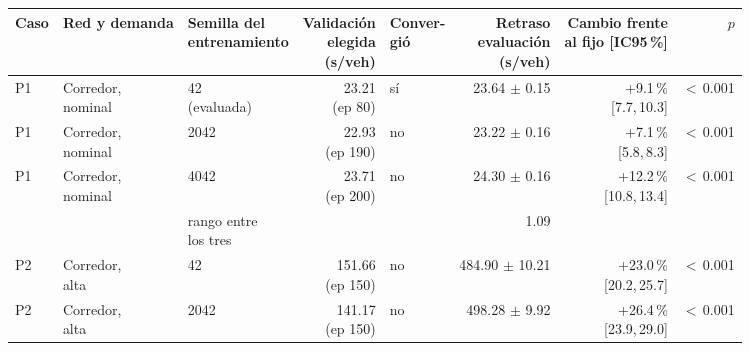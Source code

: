 \begin{table}[H]
\centering
\scriptsize
\setlength{\tabcolsep}{3pt}
\begin{tabular}{lllrlrrr}
\toprule
Caso & Red y demanda & \makecell{Semilla del\\entrenamiento} & \makecell{Validación\\elegida\\(s/veh)} & \makecell{Conver-\\gió} & \makecell{Retraso\\evaluación\\(s/veh)} & \makecell{Cambio frente\\al fijo [IC95\,\%]} & $p$ \\
\midrule
P1 & \makecell[l]{Corredor,\\{}nominal} & \makecell[l]{42\\{}(evaluada)} & \makecell[r]{23.21\\{}(ep 80)} & sí & \makecell[r]{23.64\\{}$\pm$ 0.15} & \makecell[r]{+9.1\,\%\\{}[7.7,\,10.3]} & $<$\,0.001 \\
P1 & \makecell[l]{Corredor,\\{}nominal} & 2042 & \makecell[r]{22.93\\{}(ep 190)} & no & \makecell[r]{23.22\\{}$\pm$ 0.16} & \makecell[r]{+7.1\,\%\\{}[5.8,\,8.3]} & $<$\,0.001 \\
P1 & \makecell[l]{Corredor,\\{}nominal} & 4042 & \makecell[r]{23.71\\{}(ep 200)} & no & \makecell[r]{24.30\\{}$\pm$ 0.16} & \makecell[r]{+12.2\,\%\\{}[10.8,\,13.4]} & $<$\,0.001 \\
 & & \makecell[l]{rango entre\\{}los tres} & & & 1.09 & & \\
P2 & \makecell[l]{Corredor,\\{}alta} & 42 & \makecell[r]{151.66\\{}(ep 150)} & no & \makecell[r]{484.90\\{}$\pm$ 10.21} & \makecell[r]{+23.0\,\%\\{}[20.2,\,25.7]} & $<$\,0.001 \\
P2 & \makecell[l]{Corredor,\\{}alta} & 2042 & \makecell[r]{141.17\\{}(ep 150)} & no & \makecell[r]{498.28\\{}$\pm$ 9.92} & \makecell[r]{+26.4\,\%\\{}[23.9,\,29.0]} & $<$\,0.001 \\

\end{tabular}
\end{table}
